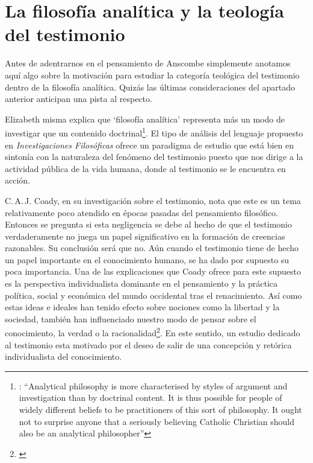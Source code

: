 \section{La filosofía analítica y la teología del testimonio}

Antes de adentrarnos en el pensamiento de Anscombe simplemente anotamos aquí algo sobre la motivación para estudiar la categoría teológica del testimonio dentro de la filosofía analítica. Quizás las últimas consideraciones del apartado anterior anticipan una pista al respecto.

Elizabeth misma explica que `filosofía analítica' representa más un modo de investigar que un contenido doctrinal\footnote{\cite[66]{anscombe2008faith:twenty}: \enquote{Analytical philosophy is more characterised by styles of argument and investigation than by doctrinal content. It is thus possible for people of widely different beliefs to be practitioners of this sort of philosophy. It ought not to surprise anyone that a seriously believing Catholic Christian should also be an analytical philosopher}}. El tipo de análisis del lenguaje propuesto en \emph{Investigaciones Filosóficas} ofrece un paradigma de estudio que está bien en sintonía con la naturaleza del fenómeno del testimonio puesto que nos dirige a la actividad pública de la vida humana, donde al testimonio se le encuentra en acción.

C.\,A.\,J. Coady, en su investigación sobre el testimonio, nota que este es un tema relativamente poco atendido en épocas pasadas del pensamiento filosófico. Entonces se pregunta si esta negligencia se debe al hecho de que el testimonio verdaderamente no juega un papel significativo en la formación de creencias razonables. Su conclusión será que no. Aún cuando el testimonio tiene de hecho un papel importante en el conocimiento humano, se ha dado por supuesto su poca importancia. Una de las explicaciones que Coady ofrece para este supuesto es la perspectiva individualista dominante en el pensamiento y la práctica política, social y económica del mundo occidental tras el renacimiento. Así como estas ideas e ideales han tenido efecto sobre nociones como la libertad y la sociedad, también han influenciado nuestro modo de pensar sobre el conocimiento, la verdad o la racionalidad\footnote{\cite[Cf.~][6--13]{coady1992test}}. En este sentido, un estudio dedicado al testimonio esta motivado por el deseo de salir de una concepción y retórica individualista del conocimiento.

